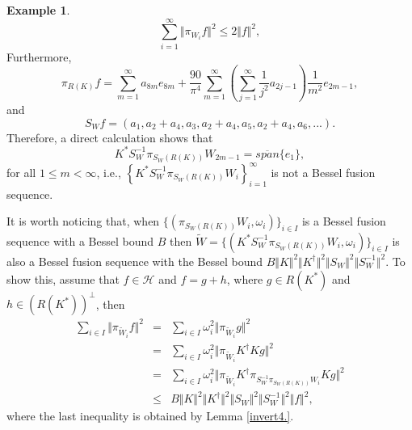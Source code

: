 \documentclass{birkjour}
\theoremstyle{definition}
\newtheorem{ex}[thm]{Example}
\theoremstyle{remark}
\numberwithin{equation}{section}
\begin{document}
\begin{ex}
\begin{equation*}
\sum_{i=1}^{\infty}\Vert \pi_{W_{i}}f \Vert^{2} \leq 2\Vert f\Vert^{2},
\end{equation*}
Furthermore,
\begin{equation*}
\pi_{R(K)}f = \sum_{m=1}^{\infty}a_{8m} e_{8m} + \dfrac{90}{\pi^{4}}\sum_{m=1}^{\infty} \left( \sum_{j=1}^{\infty} \dfrac{1}{j^{2}}a_{2j-1}\right)\dfrac{1}{m^{2}}e_{2m-1},
\end{equation*}
and
\begin{equation*}
S_{W}f = \left(  a_{1}, a_{2}+a_{4}, a_{3}, a_{2}+a_{4}, a_{5}, a_{2}+a_{4}, a_{6}, ... \right).
\end{equation*}
Therefore,  a direct calculation shows that
\begin{equation*}
K^{*}S_{W}^{-1}\pi_{S_{W}(R(K))}W_{2m-1} = \overline{span}\{e_{1}\},
\end{equation*}
 for all $1 \leq m< \infty$, i.e.,  $\left\{K^{*}S_{W}^{-1}\pi_{S_{W}(R(K))}W_{i}\right\}_{i=1}^{\infty}$ is not a Bessel fusion  sequence.
\end{ex}

It is worth noticing that, when  $\lbrace (\pi_{S_{W}(R(K))}W_{i},\omega_{i})\rbrace_{i\in I}$ is a Bessel fusion sequence
 with a Bessel  bound $B$ then $\widetilde{W} = \lbrace
(K^{*}S_{W}^{-1}\pi_{S_{W}(R(K))}W_{i},\omega_{i})\rbrace_{i\in I}$  is also
a Bessel fusion sequence with the Bessel bound $ B\Vert K\Vert^{2}\Vert K^{\dagger}\Vert^{2}\Vert S_{W}\Vert^{2}\Vert S_{W}^{-1}\Vert^{2}$. To show this, assume  that  $f\in \mathcal{H}$ and $f = g+h$, where $g\in R(K^{*})$ and $h\in (R(K^{*}))^{\perp}$, then
\begin{eqnarray*}
 \sum_{i\in I} \Vert \pi_{\widetilde{W}_{i}}f\Vert^{2}
&=&\sum_{i\in I} \omega_{i}^{2}\Vert \pi_{\widetilde{W}_{i}}g\Vert^{2}\\
&=& \sum_{i\in I} \omega_{i}^{2}\Vert \pi_{\widetilde{W}_{i}}K^{\dagger}Kg\Vert^{2}\\
&=& \sum_{i\in I} \omega_{i}^{2}\Vert \pi_{\widetilde{W}_{i}}K^{\dagger}\pi_{S_{W}^{-1}\pi_{S_{W}(R(K))}W_{i}}Kg\Vert^{2}\\
&\leq&  B\Vert K\Vert^{2}\Vert K^{\dagger}\Vert^{2}\Vert S_{W}\Vert^{2}\Vert S_{W}^{-1}\Vert^{2}\Vert f\Vert^{2},
\end{eqnarray*}
where the last inequality is obtained by Lemma \ref{invert4.}.
\end{document}
